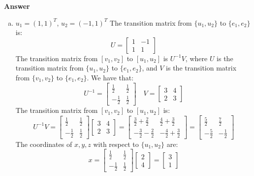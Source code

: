 \documentclass{article}
\begin{document}
\medskip
\noindent
\textbf{Answer}
\begin{enumerate}[(a)]
    \item 
    $u_1 = (1,1)^T$, $u_2 = (-1,1)^T$
    \newline
    The transition matrix from $\{u_1, u_2\}$ to $\{e_1, e_2\}$ is:
    $$ U = \begin{bmatrix} 1 & -1 \\ 1 & 1 \end{bmatrix} $$
    The transition matrix from $[v_1, v_2]$ to $[u_1, u_2]$ is $U^{-1}V$, 
    where $U$ is the transition matrix from $\{u_1, u_2\}$ to $\{e_1, e_2\}$, 
    and $V$ is the transition matrix from $\{v_1, v_2\}$ to $\{e_1, e_2\}$.
    We have that:
    $$ U^{-1} = \begin{bmatrix} \frac{1}{2} & \frac{1}{2} \\ -\frac{1}{2} & \frac{1}{2} \end{bmatrix} \quad 
    V = \begin{bmatrix} 3 & 4 \\ 2 & 3 \end{bmatrix} $$
    The transition matrix from $[v_1, v_2]$ to $[u_1, u_2]$ is:
    $$ U^{-1}V = \begin{bmatrix} \frac{1}{2} & \frac{1}{2} \\ -\frac{1}{2} & \frac{1}{2} \end{bmatrix} \begin{bmatrix} 3 & 4 \\ 2 & 3 \end{bmatrix}
     = \begin{bmatrix} \frac{3}{2} + \frac{2}{2} & \frac{4}{2} + \frac{3}{2} \\ -\frac{3}{2} - \frac{2}{2} & -\frac{4}{2} + \frac{3}{2} \end{bmatrix}
     = \begin{bmatrix} \frac{5}{2} & \frac{7}{2} \\ -\frac{5}{2} & -\frac{1}{2} \end{bmatrix} $$
    The coordinates of $x, y, z$ with respect to $\{u_1, u_2\}$ are:
    $$ 
    x = \begin{bmatrix} \frac{1}{2} & \frac{1}{2} \\ -\frac{1}{2} & \frac{1}{2} \end{bmatrix} \begin{bmatrix} 2 \\ 4 \end{bmatrix}
     = \begin{bmatrix} 3 \\ 1 \end{bmatrix}
$$
\end{enumerate}
\end{document}
